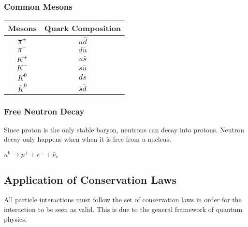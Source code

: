 \documentclass[10pt]{article}
\begin{document}
\begin{multicols*}{2}
	\subsubsection{Common Mesons}
	\begin{center}
		\begin{tabular}{|c|c|}
			\hline
			Mesons      & Quark Composition \\
			\hline
			$\pi^+$     & $u\bar{d}$        \\
			$\pi^-$     & $d\bar{u}$        \\
			$K^+$       & $u\bar{s}$        \\
			$K^-$       & $s\bar{u}$        \\
			$K^0$       & $d\bar{s}$        \\
			$\bar{K}^0$ & $s\bar{d}$        \\
			\hline
		\end{tabular}
	\end{center}

	\subsubsection{Free Neutron Decay}
	Since proton is the only stable baryon, neutrons can decay into protons. Neutron
	decay only happens when when it is free from a nucleus.

	\begin{center}

		$n^0 \longrightarrow p^+ + e^- + \bar{\nu}_e$
	\end{center}

	\subsection{Application of Conservation Laws}
	All particle interactions must follow the set of conservation laws in order for
	the interaction to be seen as valid. This is due to the general framework of
	quantum physics.


\end{multicols*}
\end{document}
